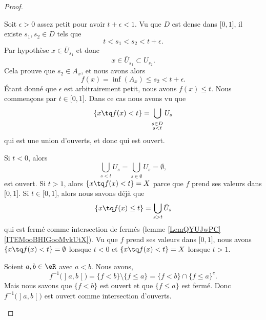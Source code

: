 \begin{proof}
\begin{subproof}
			Soit \( \epsilon>0\) assez petit pour avoir \( t+\epsilon<1\). Vu que \( D\) est dense dans \( \mathopen[ 0 , 1 \mathclose]\), il existe \( s_1,s_2\in D\) tels que
			\begin{equation}
				t<s_1<s_2<t+\epsilon.
			\end{equation}
			Par hypothèse \( x\in \bar U_{s_1}\) et donc
			\begin{equation}
				x\in \bar U_{s_1}\subset U_{s_2}.
			\end{equation}
			Cela prouve que \( s_2\in A_x\), et nous avons alors
			\begin{equation}
				f(x)=\inf(A_x)\leq s_2<t+\epsilon.
			\end{equation}
			Étant donné que \( \epsilon\) est arbitrairement petit, nous avons \( f(x)\leq t\).
			Nous commençons par \( t\in \mathopen[ 0 , 1 \mathclose]\). Dans ce cas nous avons vu que
			\begin{equation}
				\{ x\tq f(x)<t \}=\bigcup_{_{\substack{s\in D\\s<t}}}U_s
			\end{equation}
			qui est une union d'ouverts, et donc qui est ouvert.

			Si \( t<0\), alors
			\begin{equation}
				\bigcup_{s<t}U_s=\bigcup_{s\in\emptyset}U_s=\emptyset,
			\end{equation}
			est ouvert. Si \( t>1\), alors \( \{ x\tq f(x)<t \}=X\) parce que \( f\) prend ses valeurs dans \( \mathopen[ 0 , 1 \mathclose]\).
			Si \( t\in\mathopen[ 0 , 1 \mathclose]\), alors nous savons déjà que
			\begin{equation}
				\{ x\tq f(x)\leq t \}=\bigcup_{s>t}\bar U_s
			\end{equation}
			qui est fermé comme intersection de fermés (lemme \ref{LemQYUJwPC}\ref{ITEMooBHIGooMvkUtX}). Vu que \( f\) prend ses valeurs dans \( \mathopen[ 0 , 1 \mathclose]\), nous avons \( \{ x\tq f(x)<t \}=\emptyset\) lorsque \( t<0\) et \( \{ x\tq f(x)<t \}=X\) lorsque \( t>1\).
			\item[\( f\) est contiue]
			Soient \( a,b\in \eR\) avec \( a<b\). Nous avons,
			\begin{equation}
				f^{-1}\big( \mathopen] a , b \mathclose[ \big)=\{ f<b \}\setminus\{ f\leq a \}=\{ f<b \}\cap \{ f\leq a \}^c.
			\end{equation}
			Mais nous savons que \( \{ f<b \}\) est ouvert et que \( \{ f\leq a \}\) est fermé. Donc \( f^{-1}\big( \mathopen] a , b \mathclose[ \big)\) est ouvert comme intersection d'ouverts.


\end{subproof}
\end{proof}
